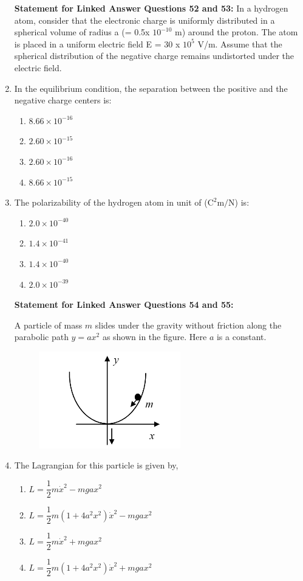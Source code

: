 \documentclass[journal,12pt,onecolumn]{IEEEtran}
\theoremstyle{remark}
\begin{document}
\begin{enumerate}
\textbf{Statement for Linked Answer Questions 52 and 53: }
In a hydrogen atom, consider that the electronic charge is uniformly distributed in a spherical volume of radius  a (= 0.5x $10^{-10}$ m) around the proton. The atom is placed in a uniform electric field E = 30 x $10^5$ V/m.
Assume that the spherical distribution of the negative charge remains undistorted under the electric field. 
\item In the equilibrium condition, the separation between the positive and the negative charge centers is:
\begin{multicols}{4}
\begin{enumerate}
    \item $ 8.66 \times 10^{-16} $
    \item $ 2.60 \times 10^{-15} $
    \item $ 2.60 \times 10^{-16} $
    \item $ 8.66 \times 10^{-15} $
\end{enumerate}
\end{multicols}
\item The polarizability of the hydrogen atom in unit of ($\mathrm{C^2 m/N}$) is:
\begin{multicols}{4}
\begin{enumerate}
    \item $ 2.0 \times 10^{-40} $
    \item $ 1.4 \times 10^{-41} $
    \item $ 1.4 \times 10^{-40} $
    \item $ 2.0 \times 10^{-39} $
\end{enumerate}
\end{multicols}
\textbf{Statement for Linked Answer Questions 54 and 55:}

A particle of mass $m$ slides under the gravity without friction along the parabolic path $ y = ax^2 $ as shown in the figure. Here $a$ is a constant.
\begin{figure}[H]
    \centering
    \includegraphics[width = 0.3\columnwidth]{fig/Q54 TO Q55.png}
    \caption*{}
    \label{fig:Q54 TO Q55.png}
\end{figure}
\item The Lagrangian for this particle is given by,
\begin{multicols}{2}
\begin{enumerate}[label=\Alph*)]
    \item $ L = \dfrac{1}{2} m\dot{x}^2 - mgax^2 $
    \item $ L = \dfrac{1}{2} m (1 + 4a^2 x^2) \dot{x}^2 - mgax^2 $
    \item $ L = \dfrac{1}{2} m\dot{x}^2 + mgax^2 $
    \item $ L = \dfrac{1}{2} m (1 + 4a^2 x^2) \dot{x}^2 + mgax^2 $
\end{enumerate}
\end{multicols}


\end{enumerate}
\end{document}
